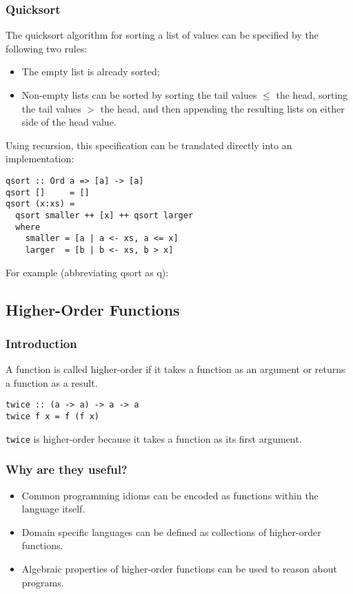 \begin{multicols}{2}
\subsubsection{Quicksort}
The quicksort algorithm for sorting a list of values can be specified by the following two rules:
\begin{itemize}
  \item The empty list is already sorted;
  \item Non-empty lists can be sorted by sorting the tail values $\leq$ the head, sorting the tail values $>$ the head, and then appending the resulting lists on either side of the head value.
\end{itemize}

Using recursion, this specification can be translated directly into an implementation:
\begin{lstlisting}
qsort :: Ord a => [a] -> [a]
qsort []     = []
qsort (x:xs) =
  qsort smaller ++ [x] ++ qsort larger
  where
    smaller = [a | a <- xs, a <= x]
    larger  = [b | b <- xs, b > x]
\end{lstlisting}

For example (abbreviating qsort as q):

\subsection{Higher-Order Functions}
\subsubsection{Introduction}
A function is called higher-order if it takes a function as an argument or returns a function as a result.
\begin{lstlisting}
twice :: (a -> a) -> a -> a
twice f x = f (f x)
\end{lstlisting}
\lstinline{twice} is higher-order because it takes a function as its first argument.

\subsubsection{Why are they useful?}
\begin{itemize}
  \item Common programming idioms can be encoded as functions within the language itself.
  \item Domain specific languages can be defined as collections of higher-order functions.
  \item Algebraic properties of higher-order functions can be used to reason about programs.
\end{itemize}


\end{multicols}
